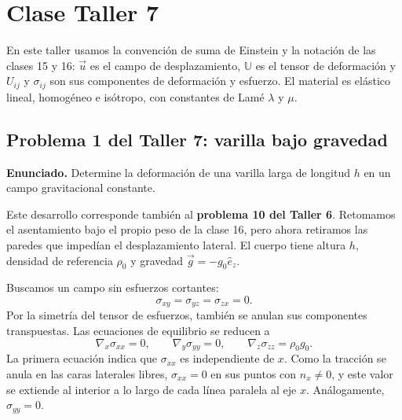 \chapter{Clase Taller 7}

En este taller usamos la convención de suma de Einstein y la notación de las clases 15 y 16: $\vec u$ es el campo de desplazamiento, $\mathbb U$ es el tensor de deformación y $U_{ij}$ y $\sigma_{ij}$ son sus componentes de deformación y esfuerzo. El material es elástico lineal, homogéneo e isótropo, con constantes de Lamé $\lambda$ y $\mu$.

\section{Problema 1 del Taller 7: varilla bajo gravedad}

\textbf{Enunciado.} Determine la deformación de una varilla larga de longitud $h$ en un campo gravitacional constante.

Este desarrollo corresponde también al \textbf{problema 10 del Taller 6}. Retomamos el asentamiento bajo el propio peso de la clase 16, pero ahora retiramos las paredes que impedían el desplazamiento lateral. El cuerpo tiene altura $h$, densidad de referencia $\rho_0$ y gravedad $\vec g=-g_0\hat e_z$.

Buscamos un campo sin esfuerzos cortantes:
\[
\sigma_{xy}=\sigma_{yz}=\sigma_{zx}=0.
\]
Por la simetría del tensor de esfuerzos, también se anulan sus componentes transpuestas. Las ecuaciones de equilibrio se reducen a
\[
\nabla_x\sigma_{xx}=0,
\qquad
\nabla_y\sigma_{yy}=0,
\qquad
\nabla_z\sigma_{zz}=\rho_0g_0.
\]
La primera ecuación indica que $\sigma_{xx}$ es independiente de $x$. Como la tracción se anula en las caras laterales libres, $\sigma_{xx}=0$ en sus puntos con $n_x\ne0$, y este valor se extiende al interior a lo largo de cada línea paralela al eje $x$. Análogamente, $\sigma_{yy}=0$.

